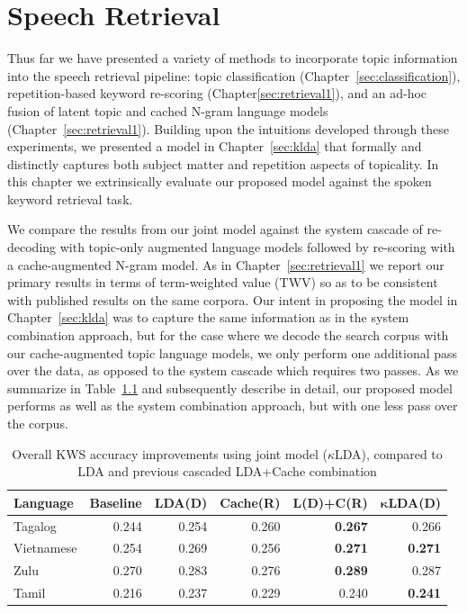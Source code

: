 \chapter{Speech Retrieval}
\label{sec:retrieval2}
Thus far we have presented a variety of methods to incorporate topic information into the speech retrieval pipeline: topic classification (Chapter~\ref{sec:classification}), repetition-based keyword re-scoring (Chapter\ref{sec:retrieval1}), and an ad-hoc fusion of latent topic and cached N-gram language models (Chapter~\ref{sec:retrieval1}).  Building upon the intuitions developed through these experiments, we presented a model in Chapter~\ref{sec:klda} that formally and distinctly captures both subject matter and repetition aspects of topicality.  In this chapter we extrinsically evaluate our proposed model against the spoken keyword retrieval task.  


We compare the results from our joint model against the system cascade of re-decoding with topic-only augmented language models followed by re-scoring with a cache-augmented N-gram model.  As in Chapter~\ref{sec:retrieval1} we report our primary results in terms of term-weighted value (TWV) so as to be consistent with published results on the same corpora.  Our intent in proposing the model in Chapter~\ref{sec:klda} was to capture the same information as in the system combination approach, but for the case where we decode the search corpus with our cache-augmented topic language models, we only perform one additional pass over the data, as opposed to the system cascade which requires two passes.  As we summarize in Table~\ref{combinedRes} and subsequently describe in detail, our proposed model performs as well as the system combination approach, but with one less pass over the corpus.

\begin{table}[t]
\centering      
   \begin{tabular}{l|rrrrr} \toprule
   \textbf{Language} & \textbf{Baseline} & \textbf{LDA(D)} & \textbf{Cache(R)} &  \textbf{L(D)+C(R)} & $\mathbf{\kappa}$\textbf{LDA(D)} \\ \midrule
Tagalog & 0.244 & 0.254 & 0.260  &\textbf{0.267} & 0.266 \\
Vietnamese & 0.254 & 0.269 & 0.256 &  \textbf{0.271} & \textbf{0.271} \\
Zulu&  0.270 & 0.283 & 0.276  & \textbf{0.289} & 0.287 \\
Tamil &  0.216 & 0.237 & 0.229 & 0.240 & \textbf{0.241} \\ \bottomrule
    \end{tabular}
\caption[Overall KWS improvements using joint models]{Overall KWS accuracy improvements using joint model ($\kappa$LDA), compared to LDA and previous cascaded LDA+Cache combination\label{combinedRes}}
\end{table}

